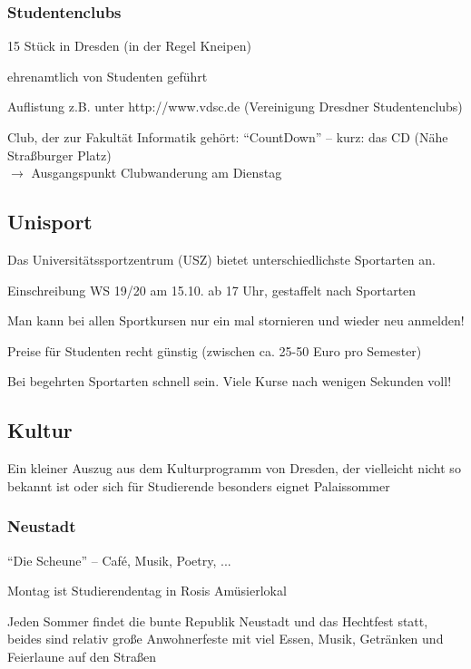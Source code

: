\documentclass[a4paper,12pt]{report}
\begin{document}
\subsubsection{Studentenclubs}
\begin{itemize*}
	\item 15 Stück in Dresden (in der Regel Kneipen)
	\item ehrenamtlich von Studenten geführt
	\item Auflistung z.B. unter http://www.vdsc.de (Vereinigung Dresdner Studentenclubs)
	\item Club, der zur Fakultät Informatik gehört: \enquote{CountDown} -- kurz: das CD (Nähe Straßburger Platz)\\
	$\rightarrow$ Ausgangspunkt Clubwanderung am Dienstag
\end{itemize*}

\subsection{Unisport}
\begin{itemize*}
	\item Das Universitätssportzentrum (USZ) bietet unterschiedlichste Sportarten an.

	\item Einschreibung WS 19/20 am 15.10. ab 17 Uhr, gestaffelt nach Sportarten
	\item Man kann  bei allen Sportkursen nur ein mal stornieren und wieder neu anmelden! 
	\item Preise für Studenten recht günstig (zwischen ca. 25-50 Euro pro Semester)
	\item Bei begehrten Sportarten schnell sein. Viele Kurse nach wenigen Sekunden voll!
\end{itemize*}

\subsection{Kultur}
Ein kleiner Auszug aus dem Kulturprogramm von Dresden, der vielleicht nicht so bekannt ist oder sich für Studierende besonders eignet
Palaissommer

\subsubsection{Neustadt}
\begin{itemize*}
	\item \enquote{Die Scheune} -- Café, Musik, Poetry, ...
	\item Montag ist Studierendentag in Rosis Amüsierlokal
	\item Jeden Sommer findet die bunte Republik Neustadt und das Hechtfest statt, beides sind relativ große Anwohnerfeste mit viel Essen, Musik, Getränken und Feierlaune auf den Straßen
\end{itemize*}
\end{document}
